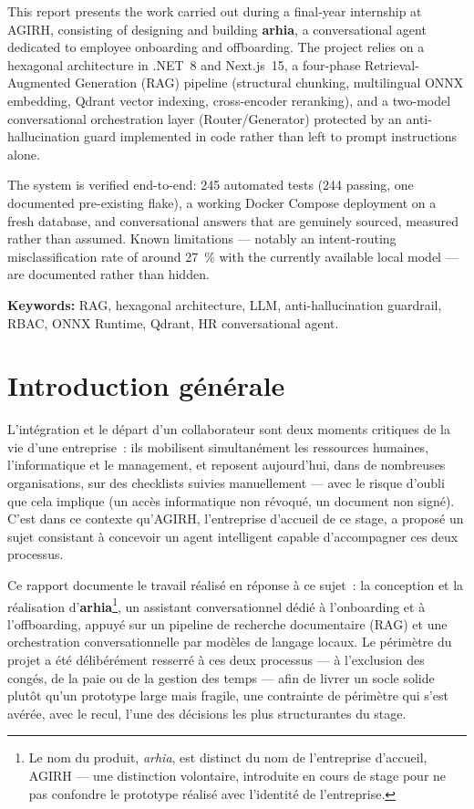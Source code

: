 \documentclass[12pt,a4paper]{article}
\begin{document}
This report presents the work carried out during a final-year internship at AGIRH, consisting of designing and building \textbf{arhia}, a conversational agent dedicated to employee onboarding and offboarding. The project relies on a hexagonal architecture in .NET~8 and Next.js~15, a four-phase Retrieval-Augmented Generation (RAG) pipeline (structural chunking, multilingual ONNX embedding, Qdrant vector indexing, cross-encoder reranking), and a two-model conversational orchestration layer (Router/Generator) protected by an anti-hallucination guard implemented in code rather than left to prompt instructions alone.

The system is verified end-to-end: 245 automated tests (244 passing, one documented pre-existing flake), a working Docker Compose deployment on a fresh database, and conversational answers that are genuinely sourced, measured rather than assumed. Known limitations --- notably an intent-routing misclassification rate of around 27~\% with the currently available local model --- are documented rather than hidden.

\textbf{Keywords:} RAG, hexagonal architecture, LLM, anti-hallucination guardrail, RBAC, ONNX Runtime, Qdrant, HR conversational agent.

\newpage
\tableofcontents
\newpage

\section*{Introduction g\'en\'erale}

L'int\'egration et le d\'epart d'un collaborateur sont deux moments critiques de la vie d'une entreprise~: ils mobilisent simultan\'ement les ressources humaines, l'informatique et le management, et reposent aujourd'hui, dans de nombreuses organisations, sur des checklists suivies manuellement --- avec le risque d'oubli que cela implique (un acc\`es informatique non r\'evoqu\'e, un document non sign\'e). C'est dans ce contexte qu'AGIRH, l'entreprise d'accueil de ce stage, a propos\'e un sujet consistant \`a concevoir un agent intelligent capable d'accompagner ces deux processus.

Ce rapport documente le travail r\'ealis\'e en r\'eponse \`a ce sujet~: la conception et la r\'ealisation d'\textbf{arhia}\footnote{Le nom du produit, \textit{arhia}, est distinct du nom de l'entreprise d'accueil, AGIRH --- une distinction volontaire, introduite en cours de stage pour ne pas confondre le prototype r\'ealis\'e avec l'identit\'e de l'entreprise.}, un assistant conversationnel dédi\'e \`a l'onboarding et \`a l'offboarding, appuy\'e sur un pipeline de recherche documentaire (RAG) et une orchestration conversationnelle par mod\`eles de langage locaux. Le p\'erim\`etre du projet a \'et\'e d\'elib\'er\'ement resserr\'e \`a ces deux processus --- \`a l'exclusion des cong\'es, de la paie ou de la gestion des temps --- afin de livrer un socle solide plut\^ot qu'un prototype large mais fragile, une contrainte de p\'erim\`etre qui s'est av\'er\'ee, avec le recul, l'une des d\'ecisions les plus structurantes du stage.
\end{document}
